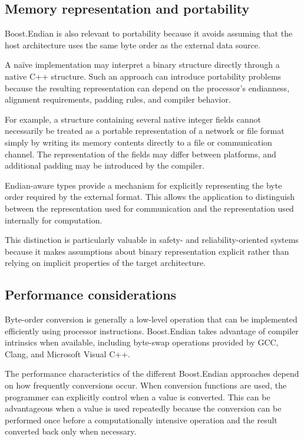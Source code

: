 \subsection{Memory representation and portability}

Boost.Endian is also relevant to portability because it avoids assuming that the host architecture uses the same byte order 
as the external data source.

A naïve implementation may interpret a binary structure directly through a native C++ structure. 
Such an approach can introduce portability problems because the resulting representation can depend on the processor's endianness, 
alignment requirements, padding rules, and compiler behavior.

For example, a structure containing several native integer fields cannot necessarily be treated as a portable representation 
of a network or file format simply by writing its memory contents directly to a file or communication channel. 
The representation of the fields may differ between platforms, and additional padding may be introduced by the compiler.

Endian-aware types provide a mechanism for explicitly representing the byte order required by the external format. 
This allows the application to distinguish between the representation used for communication and the representation used 
internally for computation.

This distinction is particularly valuable in safety- and reliability-oriented systems because it makes assumptions about 
binary representation explicit rather than relying on implicit properties of the target architecture.

\subsection{Performance considerations}

Byte-order conversion is generally a low-level operation that can be implemented efficiently using processor instructions. 
Boost.Endian takes advantage of compiler intrinsics when available, including byte-swap operations provided by GCC, Clang, 
and Microsoft Visual C++.

The performance characteristics of the different Boost.Endian approaches depend on how frequently conversions occur. 
When conversion functions are used, the programmer can explicitly control when a value is converted. 
This can be advantageous when a value is used repeatedly because the conversion can be performed once before a computationally intensive 
operation and the result converted back only when necessary.

